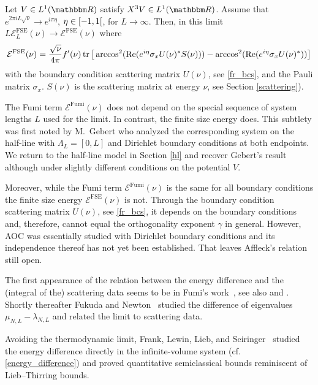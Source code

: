 \begin{theorem}\label{intro02t}
Let $V\in L^1(\R)$ satisfy $X^3V\in L^1(\R)$. 
Assume that $e^{2\pi iL\sqrt{\nu}}\to e^{i\pi\eta}$, $\eta\in\interval[open right]{-1}{1}$, for $L\to\infty$.
Then, in this limit $L\mathcal{E}_L^{\text{FSE}}(\nu)\to\mathcal{E}^{\text{FSE}}(\nu)$ where
\begin{equation*}
  \mathcal{E}^{\text{FSE}}(\nu)
      = \frac{\sqrt{\nu}}{4\pi}f'(\nu) \operatorname{tr}\big[ \arccos^2(\operatorname{Re}(e^{i\eta}\sigma_xU(\nu)^*S(\nu))) - \arccos^2(\operatorname{Re}(e^{i\eta}\sigma_xU(\nu)^*)) \big]
\end{equation*}
with the boundary condition scattering matrix $U(\nu)$, see \eqref{fr_bcs}, and the Pauli matrix $\sigma_x$.
$S(\nu)$ is the scattering matrix at energy $\nu$, see Section \ref{scattering}).
\end{theorem}

The Fumi term $\mathcal{E}^{\text{Fumi}}(\nu)$ does not depend on the special sequence of system lengths $L$ used for the limit. 
In contrast, the finite size energy does. This subtlety was first noted by M.~Gebert \cite{Gebert2015} who analyzed
the corresponding system on the half-line with $\Lambda_L = [0, L]$ and Dirichlet boundary conditions at both endpoints. 
We return to the half-line model in Section \ref{hl} and recover Gebert's result 
although under slightly different conditions on the potential $V$.

Moreover, while the Fumi term $\mathcal{E}^{\text{Fumi}}(\nu)$ is the same for all boundary conditions
the finite size energy $\mathcal{E}^{\text{FSE}}(\nu)$ is not.
Through the boundary condition scattering matrix $U(\nu)$, see \eqref{fr_bcs},
it depends on the boundary conditions and, therefore, cannot
equal the orthogonality exponent $\gamma$ in general. However, AOC was essentially studied with Dirichlet boundary
conditions and its independence thereof has not yet been established. That leaves Affleck's relation still open.

The first appearance of the relation between the energy difference and the (integral of the) scattering 
data seems to be in Fumi's work~\cite{Fumi1955}, see also \cite{LangerAmbegaokar1961} and \cite[Sec. 4.1F]{Mahan1990}.
Shortly thereafter Fukuda and Newton~\cite{FukudaNewton1956} studied the difference of eigenvalues 
$\mu_{N,L}-\lambda_{N,L}$ and related the limit to scattering data.

Avoiding the thermodynamic limit, Frank, Lewin, Lieb, and Seiringer~\cite{FrankLewinLiebSeiringer2011}
studied the energy difference directly in the infinite-volume system
(cf. \eqref{energy_difference}) and proved quantitative semiclassical bounds reminiscent of Lieb--Thirring bounds.

